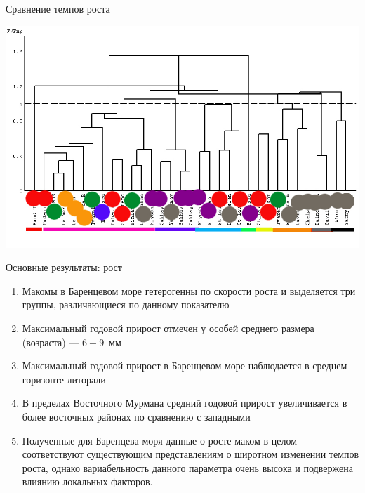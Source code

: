 \documentclass{beamer}
\begin{document}
\begin{frame}{Сравнение темпов роста}
\begin{minipage}[t]{.6\linewidth}
\begin{center}
\end{center}
	\end{minipage}
	\begin{minipage}[t]{.3\linewidth}
			\includegraphics[height=.9\textwidth, angle=90]{dendrogramma_Bertalanfi_obedinenie_col.jpg}
	\end{minipage}
\end{frame}

\begin{frame}{Основные результаты: рост}
	\begin{enumerate}
		\item Макомы в Баренцевом море гетерогенны по скорости роста и выделяется три группы, различающиеся по данному показателю
		\item Максимальный годовой прирост отмечен у особей среднего размера (возраста) --- $6 - 9$~мм
		\item Максимальный годовой прирост в Баренцевом море наблюдается в среднем горизонте литорали
		\item В пределах Восточного Мурмана средний годовой прирост увеличивается в более восточных районах по сравнению с западными
		\item Полученные для Баренцева моря данные о росте маком в целом соответствуют существующим представлениям о широтном изменении темпов роста, однако вариабельность данного параметра очень высока и подвержена влиянию локальных факторов.
	\end{enumerate}
\end{frame}
\end{document}
